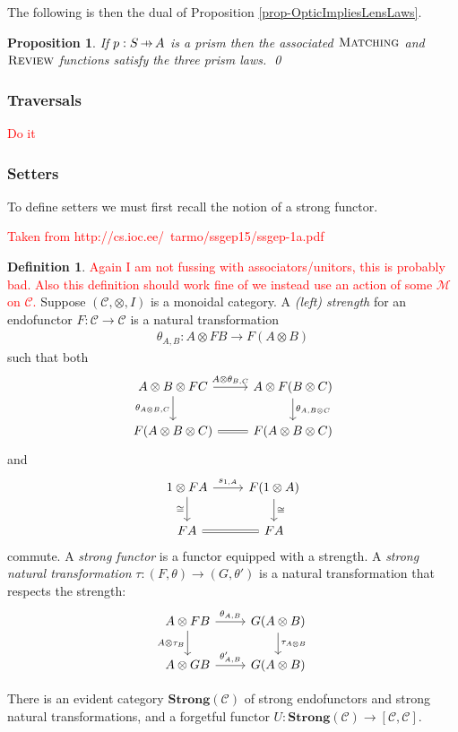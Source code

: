 \documentclass[11pt,a4paper]{article}
\theoremstyle{plain}
\newtheorem{proposition}[theorem]{Proposition}
\theoremstyle{definition}
\newtheorem{definition}[theorem]{Definition}
\newcommand{\C}{\mathscr{C}}
\newcommand{\M}{\mathscr{M}}
\newcommand{\Strong}{\mathbf{Strong}}
\newcommand{\freview}{\textsc{Review}}
\newcommand{\fmatching}{\textsc{Matching}}
\newcommand{\hto}{\ensuremath{\,\mathaccent\shortmid\rightarrow\,}}
\newcommand{\todo}[1]{\textcolor{red}{\small #1}}
\begin{document}
The following is then the dual of Proposition \ref{prop-OpticImpliesLensLaws}.
\begin{proposition}
\label{prop-OpticImpliesPrismLaws}
If $p : S \hto A$ is a prism then the associated $\fmatching$ and $\freview$ functions satisfy the three prism laws. \qed
\end{proposition}

\subsubsection{Traversals}
\todo{Do it}

\subsubsection{Setters}

To define setters we must first recall the notion of a strong functor.

\todo{Taken from http://cs.ioc.ee/~tarmo/ssgep15/ssgep-1a.pdf}
\begin{definition}
\todo{Again I am not fussing with associators/unitors, this is probably bad. Also this definition should work fine of we instead use an action of some $\M$ on $\C$.} Suppose $(\C, \otimes, I)$ is a monoidal category. A \emph{(left) strength} for an endofunctor $F : \C \to \C$ is a natural transformation
\begin{align*}
\theta_{A,B} : A \otimes F B \to F(A \otimes B)
\end{align*}
such that both
\[
\begin{tikzcd}
A \otimes B \otimes F C \ar[r, "A \otimes \theta_{B,C}"] \ar[d, "\theta_{A \otimes B, C}" left]  & A \otimes F(B\otimes C) \ar[d, "\theta_{A, B\otimes C}" right] \\
F(A \otimes B \otimes C) \ar[r, equals]& F(A \otimes B \otimes C)
\end{tikzcd}
\]
and
\[
\begin{tikzcd}
1 \otimes F A \ar[r, "s_{1,A}"] \ar[d, "\cong" left]  & F(1 \otimes A) \ar[d, "\cong" right] \\
F A \ar[r, equals] & F A
\end{tikzcd}
\]
commute. A \emph{strong functor} is a functor equipped with a strength. A \emph{strong natural transformation} $\tau : (F,\theta) \to (G,\theta')$ is a natural transformation that respects the strength:
\[
\begin{tikzcd}
A \otimes F B \ar[r, "\theta_{A,B}"] \ar[d, "A \otimes \tau_B" left]  & G(A \otimes B) \ar[d, "\tau_{A \otimes B}" right] \\
A \otimes G B \ar[r, "\theta'_{A, B}"]& G(A \otimes B)
\end{tikzcd}
\]

There is an evident category $\Strong(\C)$ of strong endofunctors and strong natural transformations, and a forgetful functor $U : \Strong(\C) \to [\C, \C]$.
\end{definition}
\end{document}
